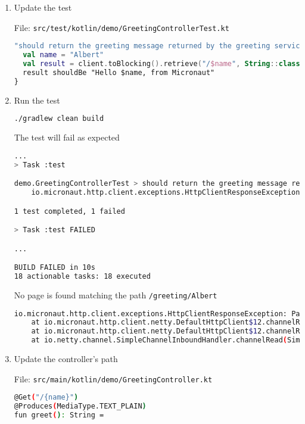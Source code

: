 \begin{enumerate}

\item Update the test

File: \texttt{src/test/kotlin/demo/GreetingControllerTest.kt}
\begin{lstlisting}[language=Kotlin]
"should return the greeting message returned by the greeting service" {
  val name = "Albert"
  val result = client.toBlocking().retrieve("/$name", String::class.java)
  result shouldBe "Hello $name, from Micronaut"
}
\end{lstlisting}

\item Run the test

\begin{lstlisting}[language=bash]
./gradlew clean build
\end{lstlisting}

The test will fail as expected

\begin{lstlisting}[language=bash]
...
> Task :test

demo.GreetingControllerTest > should return the greeting message returned by the greeting service FAILED
    io.micronaut.http.client.exceptions.HttpClientResponseException at DefaultHttpClient.java:2030

1 test completed, 1 failed

> Task :test FAILED

...

BUILD FAILED in 10s
18 actionable tasks: 18 executed
\end{lstlisting}

No page is found matching the path \texttt{/greeting/Albert}

\begin{lstlisting}[language=bash]
io.micronaut.http.client.exceptions.HttpClientResponseException: Page Not Found
	at io.micronaut.http.client.netty.DefaultHttpClient$12.channelRead0(DefaultHttpClient.java:2030)
	at io.micronaut.http.client.netty.DefaultHttpClient$12.channelRead0(DefaultHttpClient.java:1948)
	at io.netty.channel.SimpleChannelInboundHandler.channelRead(SimpleChannelInboundHandler.java:99)
\end{lstlisting}

\item Update the controller's path

File: \texttt{src/main/kotlin/demo/GreetingController.kt}
\begin{lstlisting}[language=bash]
@Get("/{name}")
@Produces(MediaType.TEXT_PLAIN)
fun greet(): String =
\end{lstlisting}


\end{enumerate}

